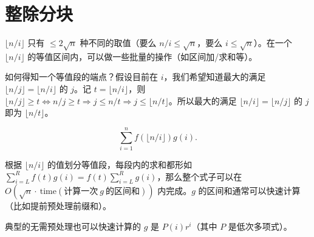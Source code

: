 \section{整除分块}
    $\lfloor n/i\rfloor$ 只有 $\le 2\sqrt{n}$ 种不同的取值（要么 $n/i\le \sqrt{n}$，要么 $i\le \sqrt{n}$）。在一个 $\lfloor n/i\rfloor$ 的等值区间内，可以做一些批量的操作（如区间加/求和等）。

    如何得知一个等值段的端点？假设目前在 $i$，我们希望知道最大的满足 $\lfloor n/j\rfloor=\lfloor n/i\rfloor$ 的 $j$。记 $t=\lfloor n/i\rfloor$，则 $\lfloor n/j\rfloor\ge t\Longleftrightarrow n/j\ge t\Longrightarrow j\le n/t\Longrightarrow j\le\lfloor n/t\rfloor$。所以最大的满足 $\lfloor n/i\rfloor=\lfloor n/j\rfloor$ 的 $j$ 即为 $\lfloor n/t\rfloor$。

    \begin{example}[最常见的形式]
        $$
        \sum_{i=1}^n f(\lfloor n/i\rfloor)g(i).
        $$
    \end{example}
    \begin{solution}
        根据 $\lfloor n/i\rfloor$ 的值划分等值段，每段内的求和都形如 $\sum_{i=L}^R f(t)g(i)=f(t)\sum_{i=L}^R g(i)$，那么整个式子可以在 $O(\sqrt{n}\cdot\ \text{time}(\text{计算一次}\ g\ \text{的区间和}))$ 内完成。$g$ 的区间和通常可以快速计算（比如提前预处理前缀和）。
    \end{solution}
    \begin{remark}
        典型的无需预处理也可以快速计算的 $g$ 是 $P(i)r^i$（其中 $P$ 是低次多项式）。
    \end{remark}

